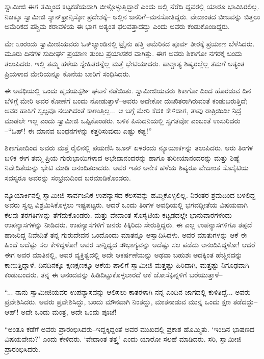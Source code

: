 ಸ್ವಾಮೀಜಿ ಈಗ ತಮ್ಮಿಂದ ಕಟ್ಟಕಡೆಯದಾಗಿ ಬೀಳ್ಗೊಳ್ಳುತ್ತಿದ್ದಾರೆ ಎಂದು ಅಲ್ಲಿ ನೆರೆದಿ ದ್ದವರಲ್ಲಿ ಯಾರೂ ಭಾವಿಸಿರಲಿಲ್ಲ. ನಿಜಕ್ಕೂ ಸ್ವಾಮೀಜಿ ಸ್ಯಾನ್​ಫ್ರಾನ್ಸಿಸ್ಕೋ ಪ್ರದೇಶಕ್ಕೆ– ಅಲ್ಲಿನ ಜನರಿಗೆ–ಮನಸೋತಿದ್ದರು. ವೇದಾಂತದ ಬೀಜವನ್ನು ಬಿತ್ತಲು ಅಮೆರಿಕದ ಪಶ್ಚಿಮ ಕರಾವಳಿಯ ಈ ಭಾಗ ಅತ್ಯಂತ ಫಲವತ್ತಾದದ್ದು ಎಂದು ಅವರು ಕಂಡುಕೊಂಡಿದ್ದರು.

ಮೇ ೩ಂರಂದು ಸ್ವಾಮೀಜಿಯವರು ಓಕ್​ಲ್ಯಾಂಡಿನಲ್ಲಿ ಟ್ರೈನು ಹತ್ತಿ ಅಮೆರಿಕದ ಪೂರ್ವ ತೀರಕ್ಕೆ ಪ್ರಯಾಣ ಬೆಳೆಸಿದರು. ಮೂರು ದಿನಗಳ ಸುದೀರ್ಘ ಪ್ರಯಾಣ ತುಂಬ ಪ್ರಯಾಸಕರ ವಾಗಿತ್ತು. ಈಗ ಅವರು ಶಿಕಾಗೋ ನಗರಕ್ಕೆ ಬಂದು ತಲುಪಿದರು. ಇಲ್ಲಿ ತಮ್ಮ ಹಳೆಯ ಸ್ನೇಹಿತರನ್ನೆಲ್ಲ ಮತ್ತೆ ಭೇಟಿಯಾದರು. ಪಾಶ್ಚಾತ್ಯ ಶಿಷ್ಯರಲ್ಲೆಲ್ಲ ತಮಗೆ ಅತ್ಯಂತ ಪ್ರಿಯಳಾದ ಮೇರಿಯನ್ನೂ ಕೊನೆಯ ಬಾರಿಗೆ ಸಂಧಿಸಿದರು.

ಈ ಅವಧಿಯಲ್ಲಿ ಒಂದು ಹೃದಯಸ್ಪರ್ಶಿ ಘಟನೆ ನಡೆಯಿತು. ಸ್ವಾಮೀಜಿಯವರು ಶಿಕಾಗೋ ದಿಂದ ಹೊರಡುವ ದಿನ ಬೆಳಿಗ್ಗೆ ಮೇರಿ ಅವರ ಕೋಣೆಗೆ ಬಂದು ನೋಡುತ್ತಾಳೆ–ಅವರು ಅದೇಕೋ ದುಃಖಿತರಾಗಿರುವಂತೆ ಕಂಡುಬರುತ್ತಿದೆ; ಅವರ ಹಾಸಿಗೆ ಸ್ವಲ್ಪವೂ ನಲುಗಿದಂತೆ ಕಾಣುತ್ತಿಲ್ಲ... ಆ ಬಗ್ಗೆ ಮೇರಿ ಕೆದಕಿ ಕೇಳಿದಾಗ, ತಾವು ರಾತ್ರಿಯಿಡೀ ನಿದ್ರೆ ಮಾಡಲೇ ಇಲ್ಲ ಎಂದು ಸ್ವಾಮೀಜಿ ಒಪ್ಪಿಕೊಂಡರು. ಬಳಿಕ ಪಿಸುದನಿಯಲ್ಲಿ ಸ್ವಗತವೋ ಎಂಬಂತೆ ಉಸುರಿದರು –“ಓಹ್! ಈ ಮಾನವ ಬಂಧನಗಳನ್ನು ಕತ್ತರಿಸುವುದು ಎಷ್ಟು ಕಷ್ಟ!”

ಶಿಕಾಗೋದಿಂದ ಅವರು ಮತ್ತೆ ರೈಲಿನಲ್ಲಿ ಪಯಣಿಸಿ ಜೂನ್ ಏಳರಂದು ನ್ಯೂಯಾರ್ಕನ್ನು ತಲುಪಿದರು. ಆರು ತಿಂಗಳ ಬಳಿಕ ಈಗ ತಮ್ಮ ಪ್ರಿಯ ಗುರುಭಾಯಿಗಳಾದ ಅಭೇದಾನಂದರನ್ನು ಹಾಗೂ ತುರೀಯಾನಂದರನ್ನು ಮತ್ತು ಶಿಷ್ಯೆ ನಿವೇದಿತೆಯನ್ನು ಭೇಟಿ ಮಾಡಿ ಆನಂದಿತರಾದರು. ಅವರ ಇತರ ಅನೇಕ ಹಳೆಯ ಶಿಷ್ಯರೂ ವೇದಾಂತ ಸೊಸೈಟಿಯ ಸದಸ್ಯರೂ ಅವರನ್ನು ಸಂಭ್ರಮದಿಂದ ಬರಮಾಡಿಕೊಂಡರು.

ನ್ಯೂಯಾರ್ಕಿನಲ್ಲಿ ಸ್ವಾಮೀಜಿ ಸಾರ್ವಜನಿಕ ಉಪನ್ಯಾಸದ ಕೆಲಸವನ್ನು ಹಮ್ಮಿಕೊಳ್ಳಲಿಲ್ಲ. ನಿರಂತರ ಶ್ರಮದಿಂದ ಬಳಲಿದ್ದ ಅವರು ಸ್ವಲ್ಪ ವಿಶ್ರಮಿಸಿಕೊಳ್ಳಲು ಇಷ್ಟಪಟ್ಟರು. ಆದರೆ ಒಂದು ತಿಂಗಳ ಅವಧಿಯಲ್ಲಿ ಭಗವದ್ಗೀತೆಯ ವಿಷಯವಾಗಿ ಕೆಲವು ತರಗತಿಗಳನ್ನು ತೆಗೆದುಕೊಂಡರು. ಮತ್ತು ವೇದಾಂತ ಸೊಸೈಟಿಯ ಕಟ್ಟಡದಲ್ಲೇ ಭಾನುವಾರಗಳಂದು ಉಪನ್ಯಾಸಗಳನ್ನು ನೀಡಿದರು. ಉಪನ್ಯಾಸಗಳಿಗೆ ಜನರು ಕಿಕ್ಕಿರಿದು ಸೇರುತ್ತಿದ್ದರು. ಈ ಎಲ್ಲ ಉಪನ್ಯಾಸಗಳಿಗೂ ತಪ್ಪದೆ ಹಾಜರಿದ್ದ ನಿವೇದಿತೆ ತನ್ನ ಗುರುದೇವನ ಒಂದೊಂದು ಮಾತನ್ನೂ ಆಸ್ವಾದಿಸಿದಳು. ಅವರ ಮಾತುಗಳನ್ನು ಆಕೆ ಈ ಹಿಂದೆ ಅದೆಷ್ಟು ಸಲ ಕೇಳಿದ್ದಳೋ! ಅವರ ಸಾನ್ನಿಧ್ಯದ ಸೌಭಾಗ್ಯವನ್ನು ಅದೆಷ್ಟು ಸಲ ಪಡೆದು ಆನಂದಿಸಿದ್ದಳೋ! ಆದರೆ ಈಗ ಅವರ ಮಾತಿನಲ್ಲಿ, ಅವರ ವ್ಯಕ್ತಿತ್ವದಲ್ಲಿ ಅದೇ ಆಕರ್ಷಣೆಯನ್ನು ಅಥವಾ ಬಹುಶಃ ಅದಕ್ಕಿಂತ ಹೆಚ್ಚಿನದನ್ನು ಕಾಣುತ್ತಿದ್ದಾಳೆ. ದಿನದಿನಕ್ಕೂ ಕ್ಷಣಕ್ಷಣಕ್ಕೂ ಆಕೆಯ ಪಾಲಿಗೆ ಸ್ವಾಮೀಜಿ ಮತ್ತಷ್ಟು ಹಿರಿದಾಗಿ, ಮತ್ತಷ್ಟು ನಿಗೂಢವಾಗಿ ಕಂಡುಬಂದರು. ತನ್ನ ಈ ಆನಂದವನ್ನು ಹಿಡಿದಿಟ್ಟುಕೊಳ್ಳಲಾರದೆ ಆಕೆ ಜೋಸೆಫಿನ್ನಳಿಗೆ ಬರೆಯುತ್ತಾಳೆ–

“... ನಾನು ಸ್ವಾಮೀಜಿಯವರ ಉಪನ್ಯಾಸವನ್ನು ಆಲಿಸಲು ಕಾತರಳಾಗಿ ನನ್ನ ಎಂದಿನ ಜಾಗದಲ್ಲಿ ಕುಳಿತಿದ್ದೆ... ಅವರು ಪ್ರವೇಶಿಸಿದರು. ಅವರು ಪ್ರವೇಶಿಸಿದ್ದು, ಬಂದು ಮೌನವಾಗಿ ನಿಂತದ್ದು, ಮಾತನಾಡುವ ಮುನ್ನ ಒಂದು ಕ್ಷಣ ತಡೆದದ್ದು–ಆಹ್! ಅದೇ ಒಂದು ಮಂತ್ರ, ಅದೇ ಒಂದು ಪೂಜೆ!

“ಅಂತೂ ಕಡೆಗೆ ಅವರು ಪ್ರಾರಂಭಿಸಿದರು–ಇದ್ದಕ್ಕಿದ್ದಂತೆ ಅವರ ಮುಖದಲ್ಲಿ ಪ್ರಕಾಶ ಹೊಮ್ಮಿತು. ‘ಇಂದಿನ ಭಾಷಣದ ವಿಷಯವೇನು?’ ಎಂದು ಕೇಳಿದರು. ‘ವೇದಾಂತ ತತ್ತ್ವ’ ಎಂದು ಯಾರೋ ಸಲಹೆ ಮಾಡಿದರು. ಸರಿ, ಸ್ವಾಮೀಜಿ ಪ್ರಾರಂಭಿಸಿದರು.

